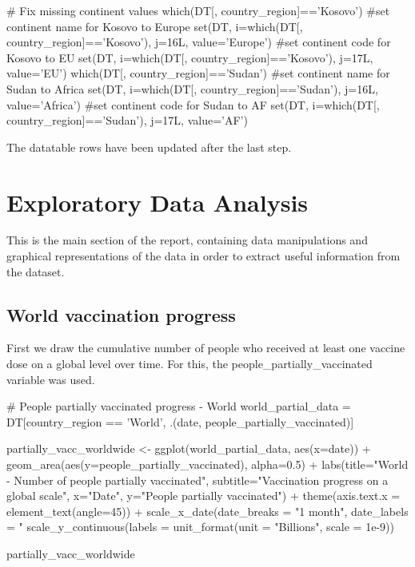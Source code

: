 \begin{Rcode}{\scriptsize}
# Fix missing continent values
which(DT[, country_region]=='Kosovo')
#set continent name for Kosovo to Europe
set(DT, i=which(DT[, country_region]=='Kosovo'), j=16L, value='Europe') 
#set continent code for Kosovo to EU
set(DT, i=which(DT[, country_region]=='Kosovo'), j=17L, value='EU') 
which(DT[, country_region]=='Sudan')
#set continent name for Sudan to Africa
set(DT, i=which(DT[, country_region]=='Sudan'), j=16L, value='Africa') 
#set continent code for Sudan to AF
set(DT, i=which(DT[, country_region]=='Sudan'), j=17L, value='AF') 
\end{Rcode}
The datatable rows have been updated after the last step.

\section{Exploratory Data Analysis}
This is the main section of the report, containing data manipulations and graphical representations of the data in order to extract useful information from the dataset.

\subsection{World vaccination progress}
First we draw the cumulative number of people who received at least one vaccine dose on a global level over time. For this, the people\_partially\_vaccinated variable was used.

\begin{Rcode}{\scriptsize}
# People partially vaccinated progress - World
world_partial_data = DT[country_region == 'World', 
                        .(date, people_partially_vaccinated)]

partially_vacc_worldwide <-  
  ggplot(world_partial_data, aes(x=date)) +
  geom_area(aes(y=people_partially_vaccinated), alpha=0.5) +
  labs(title="World - Number of people partially vaccinated",
       subtitle="Vaccination progress on a global scale",
       x="Date", 
       y="People partially vaccinated") +
  theme(axis.text.x = element_text(angle=45)) + 
  scale_x_date(date_breaks = "1 month", date_labels = "%
  scale_y_continuous(labels = unit_format(unit = "Billions", scale = 1e-9))

partially_vacc_worldwide
\end{Rcode}


